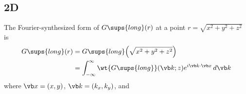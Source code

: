 \documentclass[letterpaper]{article}
\begin{document}
\subsection{2D}

The Fourier-synthesized form of $G\sups{long}(r)$ at
a point $r=\sqrt{x^2+y^2+z^2}$ is
\begin{align*}
 G\sups{long}(r)
   &=G\sups{long}\Big( \sqrt{x^2 + y^2 + z^2} \Big)
\\
   &=\int_{-\infty}^\infty \wt{G\sups{long}}(\vb k; z) e^{i\vb k \cdot \vb x} \, d\vb k
\end{align*}
where $\vb x=(x,y)$, $\vb k=(k_x, k_y)$, and 
%

\end{document}
